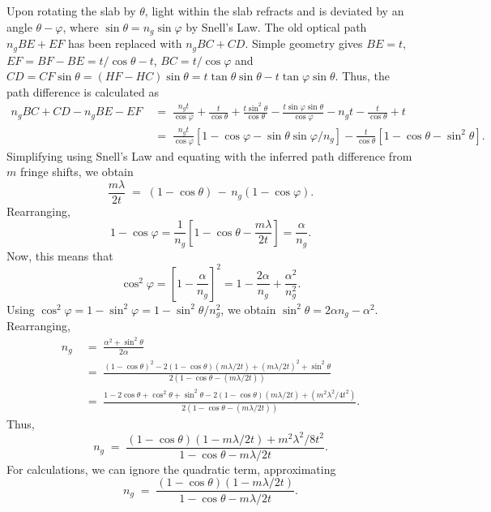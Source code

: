 \documentclass[11pt]{article}
\begin{document}
        Upon rotating the slab by $\theta$, light within the slab refracts and is deviated by an angle $\theta - \varphi$, where 
        $\sin\theta = n_g\sin\varphi$ by Snell's Law.
        The old optical path $n_g BE + EF$ has been replaced with $n_g BC + CD$.
        Simple geometry gives $BE = t$, $EF = BF - BE = t/\cos\theta - t$, $BC = t/\cos\varphi$ and 
        $CD = CF\sin\theta = (HF - HC)\sin\theta = t\tan\theta\sin\theta - t\tan\varphi\sin\theta$.
        Thus, the path difference is calculated as
        \begin{align*}
        n_g BC + CD - n_g BE - EF 
                        \;&=\; \frac{n_g t}{\cos\varphi} + \frac{t}{\cos\theta} + \frac{t\sin^2\theta}{\cos\theta} - 
                                \frac{t\sin\varphi\sin\theta}{\cos\varphi} - n_g t - \frac{t}{\cos\theta} + t \\
                        \;&=\; \frac{n_g t}{\cos\varphi}[1 - \cos\varphi - \sin\theta\sin\varphi /n_g] - 
                                \frac{t}{\cos\theta}[1 - \cos\theta - \sin^2\theta].
        \end{align*}
        Simplifying using Snell's Law and equating with the inferred path difference from $m$ fringe shifts, we obtain
        \[
                \frac{m \lambda}{2t} \;=\; (1 - \cos\theta) \,-\, n_g(1 - \cos\varphi).
        \]
        Rearranging,
        \[
                1 - \cos\varphi = \frac{1}{n_g}\left[1 - \cos\theta - \frac{m\lambda}{2t}\right] = \frac{\alpha}{n_g}.
        \]
        Now, this means that
        \[
                \cos^2\varphi = \left[1 - \frac{\alpha}{n_g}\right]^2 = 1 - \frac{2\alpha}{n_g} + \frac{\alpha^2}{n_g^2}.
        \]
        Using $\cos^2\varphi = 1 - \sin^2\varphi = 1 - \sin^2\theta /n_g^2$, we obtain $\sin^2\theta = 2\alpha n_g - \alpha^2$.
        Rearranging,
        \begin{align*}
                n_g \;&=\; \frac{\alpha^2 + \sin^2\theta}{2\alpha} \\
                        \;&=\; \frac{(1 - \cos\theta)^2 - 2(1 - \cos\theta)(m\lambda /2t) + (m\lambda /2t)^2 + \sin^2\theta}
                                        {2(1 - \cos\theta - (m\lambda /2t))} \\
                        \;&=\; \frac{1 - 2\cos\theta + \cos^2\theta + \sin^2\theta - 2(1 - \cos\theta)(m\lambda /2t) + (m^2\lambda^2/4t^2)}
                                {2(1 - \cos\theta - (m\lambda/2t))}.
        \end{align*}
        Thus,
        \[
                n_g \;=\; \frac{(1 - \cos\theta)(1 - m\lambda/2t) + m^2\lambda^2/{8t^2}}{1 - \cos\theta - m\lambda/2t}.
        \]
        For calculations, we can ignore the quadratic term, approximating
        \[
                n_g \;=\; \frac{(1 - \cos\theta)(1 - m\lambda/2t)}{1 - \cos\theta - m\lambda/2t}. \tag{$\star$}\label{eq:working}
        \]
\end{document}
